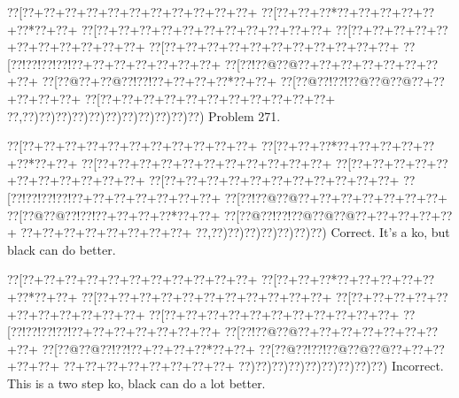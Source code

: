 \documentclass[a5paper]{article}
\begin{document}
\newpage
\begin{center}
{\goo
\0??[\0??+\0??+\0??+\0??+\0??+\0??+\0??+\0??+\0??+\0??+\0??+
\0??[\0??+\0??+\0??*\0??+\0??+\0??+\0??+\0??+\0??*\0??+\0??+
\0??[\0??+\0??+\0??+\0??+\0??+\0??+\0??+\0??+\0??+\0??+\0??+
\0??[\0??+\0??+\0??+\0??+\0??+\0??+\0??+\0??+\0??+\0??+\0??+
\0??[\0??+\0??+\0??+\0??+\0??+\0??+\0??+\0??+\0??+\0??+\0??+
\0??[\0??!\0??!\0??!\0??!\0??+\0??+\0??+\0??+\0??+\0??+\0??+
\0??[\0??!\0??@\0??@\0??+\0??+\0??+\0??+\0??+\0??+\0??+\0??+
\0??[\0??@\0??+\0??@\0??!\0??!\0??+\0??+\0??+\0??*\0??+\0??+
\0??[\0??@\0??!\0??!\0??@\0??@\0??@\0??+\0??+\0??+\0??+\0??+
\0??[\0??+\0??+\0??+\0??+\0??+\0??+\0??+\0??+\0??+\0??+\0??+
\0??,\0??)\0??)\0??)\0??)\0??)\0??)\0??)\0??)\0??)\0??)\0??)
}
Problem 271.

\end{center}
\begin{center}
{\goo
\0??[\0??+\0??+\0??+\0??+\0??+\0??+\0??+\0??+\0??+\0??+\0??+
\0??[\0??+\0??+\0??*\0??+\0??+\0??+\0??+\0??+\0??*\0??+\0??+
\0??[\0??+\0??+\0??+\0??+\0??+\0??+\0??+\0??+\0??+\0??+\0??+
\0??[\0??+\0??+\0??+\0??+\0??+\0??+\0??+\0??+\0??+\0??+\0??+
\0??[\0??+\0??+\0??+\0??+\0??+\0??+\0??+\0??+\0??+\0??+\0??+
\0??[\0??!\0??!\0??!\0??!\0??+\0??+\0??+\0??+\0??+\0??+\0??+
\0??[\0??!\0??@\0??@\0??+\0??+\0??+\0??+\0??+\0??+\0??+
\0??[\0??@\0??@\0??!\0??!\0??+\0??+\0??+\0??*\0??+\0??+
\0??[\0??@\0??!\0??!\0??@\0??@\0??@\0??+\0??+\0??+\0??+\0??+
\0??+\0??+\0??+\0??+\0??+\0??+\0??+\0??+
\0??,\0??)\0??)\0??)\0??)\0??)\0??)\0??)
}
Correct. It's a ko, but black can do better.

\end{center}
\begin{center}
{\goo
\0??[\0??+\0??+\0??+\0??+\0??+\0??+\0??+\0??+\0??+\0??+\0??+
\0??[\0??+\0??+\0??*\0??+\0??+\0??+\0??+\0??+\0??*\0??+\0??+
\0??[\0??+\0??+\0??+\0??+\0??+\0??+\0??+\0??+\0??+\0??+\0??+
\0??[\0??+\0??+\0??+\0??+\0??+\0??+\0??+\0??+\0??+\0??+\0??+
\0??[\0??+\0??+\0??+\0??+\0??+\0??+\0??+\0??+\0??+\0??+\0??+
\0??[\0??!\0??!\0??!\0??!\0??+\0??+\0??+\0??+\0??+\0??+\0??+
\0??[\0??!\0??@\0??@\0??+\0??+\0??+\0??+\0??+\0??+\0??+\0??+
\0??[\0??@\0??@\0??!\0??!\0??+\0??+\0??+\0??*\0??+\0??+
\0??[\0??@\0??!\0??!\0??@\0??@\0??@\0??+\0??+\0??+\0??+\0??+
\0??+\0??+\0??+\0??+\0??+\0??+\0??+\0??+
\0??)\0??)\0??)\0??)\0??)\0??)\0??)\0??)\0??)
}
Incorrect. This is a two step ko, black can do a lot better.

\end{center}
\end{document}
